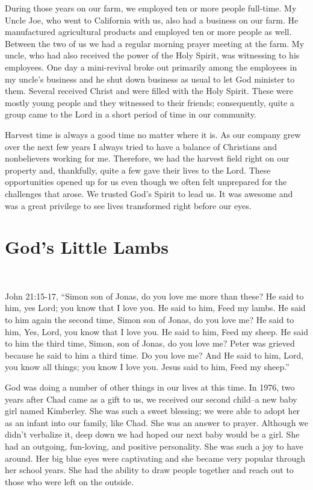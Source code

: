\documentclass[twoside, 12pt]{book}
\begin{document}
During those years on our farm, we employed ten or more people full-time. My Uncle Joe, who went to California with us, also had a business on our farm. He manufactured agricultural products and employed ten or more people as well. Between the two of us we had a regular morning prayer meeting at the farm. My uncle, who had also received the power of the Holy Spirit, was witnessing to his employees. One day a mini-revival broke out primarily among the employees in my uncle’s business and he shut down business as usual to let God minister to them. Several received Christ and were filled with the Holy Spirit. These were mostly young people and they witnessed to their friends; consequently, quite a group came to the Lord in a short period of time in our community.

Harvest time is always a good time no matter where it is. As our company grew over the next few years I always tried to have a balance of Christians and nonbelievers working for me. Therefore, we had the harvest field right on our property and, thankfully, quite a few gave their lives to the Lord. These opportunities opened up for us even though we often felt unprepared for the challenges that arose. We trusted God's Spirit to lead us. It was awesome and was a great privilege to see lives transformed right before our eyes.


\section{God's Little Lambs}
\

John 21:15-17, “Simon son of Jonas, do you love me more than these? He said to him, yes Lord; you know that I love you. He said to him, Feed my lambs. He said to him again the second time, Simon son of Jonas, do you love me? He said to him, Yes, Lord, you know that I love you. He said to him, Feed my sheep. He said to him the third time, Simon, son of Jonas, do you love me? Peter was grieved because he said to him a third time. Do you love me? And He said to him, Lord, you know all things; you know I love you. Jesus said to him, Feed my sheep.”

God was doing a number of other things in our lives at this time. In 1976, two years after Chad came as a gift to us, we received our second child--a new baby girl named Kimberley. She was such a sweet blessing; we were able to adopt her as an infant into our family, like Chad. She was an answer to prayer. Although we didn't verbalize it, deep down we had hoped our next baby would be a girl. She had an outgoing, fun-loving, and positive personality. She was such a joy to have around. Her big blue eyes were captivating and she became very popular through her school years. She had the ability to draw people together and reach out to those who were left on the outside.
\end{document}
